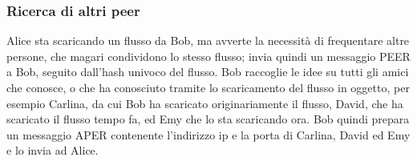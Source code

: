 \subsubsection{Ricerca di altri peer}
Alice sta scaricando un flusso da Bob, ma avverte la necessità di frequentare
altre persone, che magari condividono lo stesso flusso; invia quindi un messaggio
PEER a Bob, seguito dall'hash univoco del flusso. Bob raccoglie le idee su tutti
gli amici che conosce, o che ha conosciuto tramite lo scaricamento del flusso in
oggetto, per esempio Carlina, da cui Bob ha scaricato originariamente il flusso,
David, che ha scaricato il flusso tempo fa, ed Emy che lo sta scaricando ora. Bob
quindi prepara un messaggio APER contenente l'indirizzo ip e la porta di Carlina,
David ed Emy e lo invia ad Alice.


